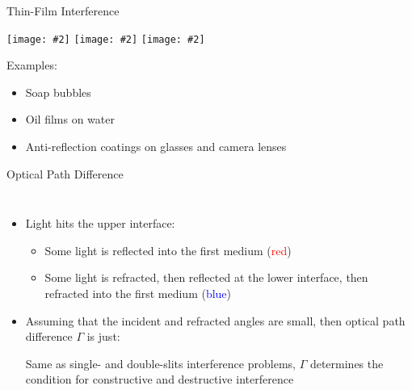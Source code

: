 \documentclass[12pt,compress,aspectratio=169]{beamer}
\newcommand{\pic}[2]{\texttt{[image: \#2]}}
\newcommand{\eq}[2]{\vspace{#1}{\LARGE\begin{displaymath}#2\end{displaymath}}}
\begin{document}
\begin{frame}{Thin-Film Interference}
  \begin{center}
    \pic{.4}{soap-bubble}\hspace{.01in}
    \pic{.277}{oil-film}\hspace{.01in}
    \pic{.2265}{camera-lens}
  \end{center}
  Examples:
  \begin{itemize}
  \item Soap bubbles
  \item Oil films on water
  \item Anti-reflection coatings on glasses and camera lenses
  \end{itemize}
\end{frame}



\begin{frame}{Optical Path Difference}
  \begin{columns}
    
    \begin{itemize}
    \item Light hits the upper interface:
      \begin{itemize}
      \item Some light is reflected into the first medium
        (\textcolor{red}{red})
      \item Some light is refracted, then reflected at the lower interface,
        then refracted into the first medium (\textcolor{blue}{blue})
      \end{itemize}
    \item Assuming that the incident and refracted angles are small, then
      optical path difference $\Gamma$ is just:

    \eq{-.25in}{
      \Gamma=2t
    }

    \vspace{-.15in}Same as single- and double-slits interference problems,
    $\Gamma$ determines the condition for constructive and destructive
    interference
    \end{itemize}
  \end{columns}
\end{frame}
\end{document}
